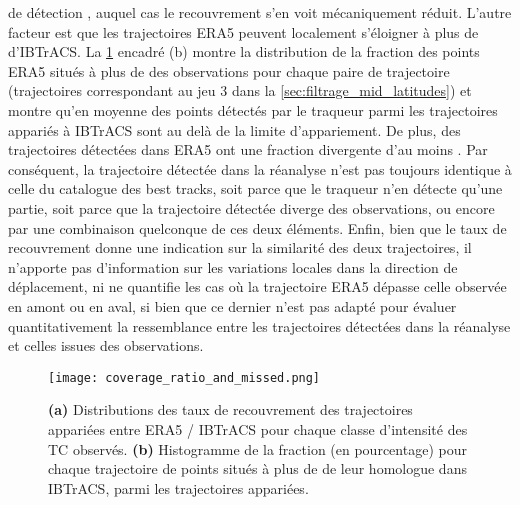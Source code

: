 \documentclass[../main.tex]{subfiles}
\begin{document}
de détection \parencite[][Figure 8]{bourdin_intercomparison_2022}, auquel cas le recouvrement s'en voit mécaniquement réduit. L'autre facteur est que les
trajectoires ERA5 peuvent localement s'éloigner à plus de  d'IBTrACS. La \cref{fig:coverage_ratio} encadré (b) montre la distribution de la fraction des
points ERA5 situés à plus de  des observations pour chaque paire de trajectoire (trajectoires correspondant au jeu 3 dans la
\cref{sec:filtrage_mid_latitudes}) et montre qu'en moyenne  des points détectés par le traqueur parmi les trajectoires appariés à IBTrACS sont au delà
de la limite d'appariement. De plus,  des trajectoires détectées dans ERA5 ont une fraction divergente d'au moins . Par conséquent, la
trajectoire détectée dans la réanalyse n'est pas toujours identique à celle du catalogue des best tracks, soit parce que le traqueur n'en détecte qu'une partie,
soit parce que la trajectoire détectée diverge des observations, ou encore par une combinaison quelconque de ces deux éléments. Enfin, bien que le taux de
recouvrement donne une indication sur la similarité des deux trajectoires, il n'apporte pas d'information sur les variations locales dans la direction de
déplacement, ni ne quantifie les cas où la trajectoire ERA5 dépasse celle observée en amont ou en aval, si bien que ce dernier n'est pas adapté pour évaluer
quantitativement la ressemblance entre les trajectoires détectées dans la réanalyse et celles issues des observations.

\begin{figure}[tb]
    \centering
    \texttt{[image: coverage\_ratio\_and\_missed.png]}
    \caption{\textbf{(a)} Distributions des taux de recouvrement des trajectoires appariées entre ERA5 / IBTrACS pour chaque classe d'intensité des TC observés.
    \textbf{(b)} Histogramme de la fraction (en pourcentage) pour chaque trajectoire de points situés à plus de  de leur homologue dans IBTrACS, parmi
    les trajectoires appariées.}
    \label{fig:coverage_ratio}
\end{figure}
\end{document}
